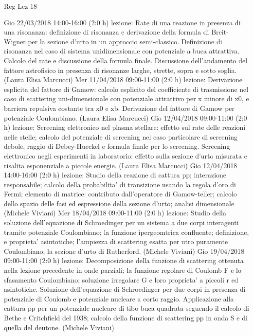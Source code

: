 \begin{frame}[allowframebreaks]{Reg Lez 18}
\begin{itemize}
    Gio 22/03/2018 14:00-16:00 (2:0 h) lezione: Rate di una reazione in presenza di una risonanza: definizione di risonanza e derivazione della formula di Breit-Wigner per la sezione d'urto in un approccio semi-classico. Definizione di risonanza nel caso di sistema unidimensionale con potenziale a buca attrattiva. Calcolo del rate e discussione della formula finale. Discussione dell'andamento del fattore astrofisico in presenza di risonanze larghe, strette, sopra e sotto soglia. (Laura Elisa Marcucci)
    Mer 11/04/2018 09:00-11:00 (2:0 h) lezione: Derivazione esplicita del fattore di Gamow: calcolo esplicito del coefficiente di trasmissione nel caso di scattering uni-dimensionale con potenziale attrattivo per x minore di x0, e barriera repulsiva costante tra x0 e xb. Derivazione del fattore di Gamow per potenziale Coulombiano. (Laura Elisa Marcucci)
    Gio 12/04/2018 09:00-11:00 (2:0 h) lezione: Screening elettronico nel plasma stellare: effetto sul rate delle reazioni nelle stelle; calcolo del potenziale di screening nel caso particolare di screening debole, raggio di Debey-Hueckel e formula finale per lo screening. Screening elettronico negli esperimenti in laboratorio: effetto sulla sezione d'urto misurata e risalita esponenziale a piccole energie. (Laura Elisa Marcucci)
    Gio 12/04/2018 14:00-16:00 (2:0 h) lezione: Studio della reazione di cattura pp; interazione responsabile; calcolo della probabilita' di transizione usando la regola d'oro di Fermi; elemento di matrice: contributo dall'operatore di Gamow-teller; calcolo dello spazio delle fasi ed espressione della sezione d'urto; analisi dimensionale (Michele Viviani)
    Mer 18/04/2018 09:00-11:00 (2:0 h) lezione: Studio della soluzione dell'equazione di Schroedinger per un sistema a due corpi interagenti tramite potenziale Coulombiano; la funzione ipergeomtrica confluente; definizione, e proprieta' asintotiche; l'ampiezza di scattering esatta per utro puramente Coulombiano; la sezione d'urto di Rutherford. (Michele Viviani)
    Gio 19/04/2018 09:00-11:00 (2:0 h) lezione: Decomposizione della funzione di scattering ottenuta nella lezione precedente in onde parziali; la funzione regolare di Coulomb F e lo sfasamento Coulombiano; soluzione irregolare G e loro proprieta' a piccoli r ed asintotiche. Soluzione dell'equazione di Schroedinger per due corpi in presenza di potenziale di Coulomb e potenziale nucleare a corto raggio. Applicazione alla cattura pp per un potenziale nucleare di tibo buca quadrata seguendo il calcolo di Bethe e Critchfield del 1938; calcolo della funzione di scattering pp in onda S e di quella del deutone. (Michele Viviani)

\end{itemize}
\end{frame}
